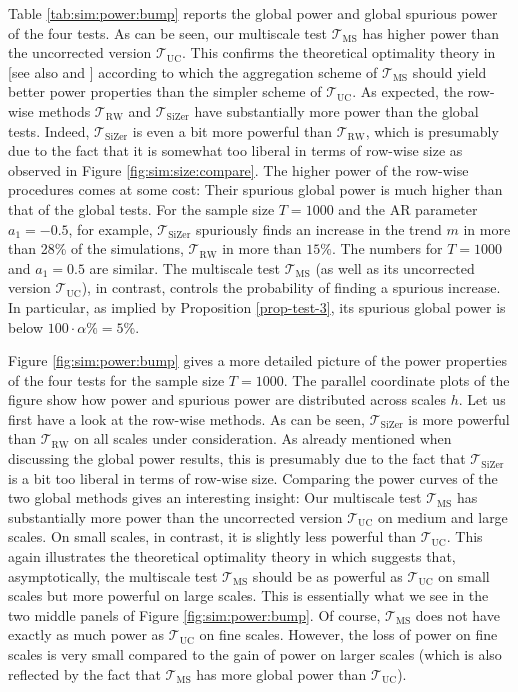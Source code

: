 Table \ref{tab:sim:power:bump} reports the global power and global spurious power of the four tests. As can be seen, our multiscale test $\mathcal{T}_{\text{MS}}$ has higher power than the uncorrected version $\mathcal{T}_{\text{UC}}$. This confirms the theoretical optimality theory in \cite{DuembgenSpokoiny2001} [see also \cite{DuembgenWalther2008} and \cite{RufibachWalther2010}] according to which the aggregation scheme of $\mathcal{T}_{\text{MS}}$ should yield better power properties than the simpler scheme of $\mathcal{T}_{\text{UC}}$. As expected, the row-wise methods $\mathcal{T}_{\text{RW}}$ and $\mathcal{T}_{\text{SiZer}}$ have substantially more power than the global tests. Indeed, $\mathcal{T}_{\text{SiZer}}$ is even a bit more powerful than $\mathcal{T}_{\text{RW}}$, which is presumably due to the fact that it is somewhat too liberal in terms of row-wise size as observed in Figure \ref{fig:sim:size:compare}. The higher power of the row-wise procedures comes at some cost: Their spurious global power is much higher than that of the global tests. For the sample size $T=1000$ and the AR parameter $a_1=-0.5$, for example, $\mathcal{T}_{\text{SiZer}}$ spuriously finds an increase in the trend $m$ in more than 28\% of the simulations, $\mathcal{T}_{\text{RW}}$ in more than $15\%$. The numbers for $T=1000$ and $a_1=0.5$ are similar. The multiscale test $\mathcal{T}_{\text{MS}}$ (as well as its uncorrected version $\mathcal{T}_{\text{UC}}$), in contrast, controls the probability of finding a spurious increase. In particular, as implied by Proposition \ref{prop-test-3}, its spurious global power is below $100\cdot\alpha\% = 5\%$.  


Figure \ref{fig:sim:power:bump} gives a more detailed picture of the power properties of the four tests for the sample size $T=1000$. The parallel coordinate plots of the figure show how power and spurious power are distributed across scales $h$. Let us first have a look at the row-wise methods. As can be seen, $\mathcal{T}_{\text{SiZer}}$ is more powerful than $\mathcal{T}_{\text{RW}}$ on all scales under consideration. As already mentioned when discussing the global power results, this is presumably due to the fact that $\mathcal{T}_{\text{SiZer}}$ is a bit too liberal in terms of row-wise size. Comparing the power curves of the two global methods gives an interesting insight: Our multiscale test $\mathcal{T}_{\text{MS}}$ has substantially more power than the uncorrected version $\mathcal{T}_{\text{UC}}$ on medium and large scales. On small scales, in contrast, it is slightly less powerful than $\mathcal{T}_{\text{UC}}$. This again illustrates the theoretical optimality theory in \cite{DuembgenSpokoiny2001} which suggests that, asymptotically, the multiscale test $\mathcal{T}_{\text{MS}}$ should be as powerful as $\mathcal{T}_{\text{UC}}$ on small scales but more powerful on large scales. This is essentially what we see in the two middle panels of Figure \ref{fig:sim:power:bump}. Of course, $\mathcal{T}_{\text{MS}}$ does not have exactly as much power as $\mathcal{T}_{\text{UC}}$ on fine scales. However, the loss of power on fine scales is very small compared to the gain of power on larger scales (which is also reflected by the fact that $\mathcal{T}_{\text{MS}}$ has more global power than $\mathcal{T}_{\text{UC}}$). 


